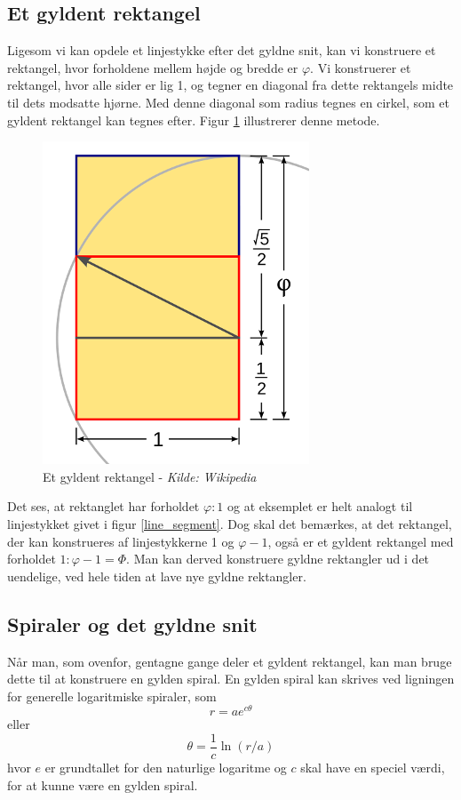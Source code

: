 {\subsection{Et gyldent rektangel}
Ligesom vi kan opdele et linjestykke efter det gyldne snit,
kan vi konstruere et rektangel, hvor forholdene mellem højde og bredde er
$\varphi$. Vi konstruerer et rektangel, hvor alle sider er lig 1, og
tegner en diagonal fra dette rektangels midte til dets modsatte hjørne. Med
denne diagonal som radius tegnes en cirkel, som et gyldent rektangel kan
tegnes efter. Figur \ref{golden_rectangle} illustrerer denne metode.

\begin{figure}[t]
	\centering
	\includegraphics[scale=0.35,angle=0]{afsnit/baggrund/billeder/Golden_Rectangle_Construction}
	\caption[Et gyldent rektangel]{Et gyldent rektangel - \emph{Kilde: Wikipedia}}
	\label{golden_rectangle}
\end{figure}

Det ses, at rektanglet har forholdet $\varphi:1$ og at eksemplet er helt
analogt til linjestykket givet i figur \ref{line_segment}. Dog skal
det bemærkes, at det rektangel, der kan konstrueres af linjestykkerne 1
og $\varphi - 1$, også er et gyldent rektangel med forholdet $1:\varphi
-1 = \varPhi$. Man kan derved konstruere gyldne rektangler ud i det
uendelige, ved hele tiden at lave nye gyldne rektangler.

\subsection{Spiraler og det gyldne snit}
Når man, som ovenfor, gentagne gange deler et gyldent rektangel, kan man
bruge dette til at konstruere en gylden spiral. En gylden spiral kan
skrives ved ligningen for generelle logaritmiske spiraler, som
\begin{equation}
	r = ae^{c\theta}
	\label{log_spiral_2}
\end{equation}
eller
\begin{equation}
	\theta = \frac{1}{c}\ln(r/a)
	\label{log_spiral_1}
\end{equation}
hvor $e$ er grundtallet for den naturlige logaritme og $c$ skal have en
speciel værdi, for at kunne være en gylden spiral.

}
